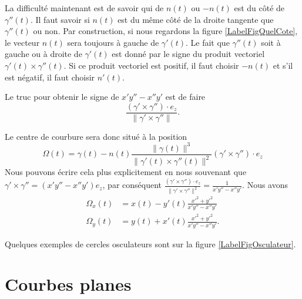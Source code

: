La difficulté maintenant est de savoir qui de $n(t)$ ou $-n(t)$ est du côté de $\gamma''(t)$. Il faut savoir si $n(t)$ est du même côté de la droite tangente que $\gamma''(t)$ ou non. Par construction, si nous regardons la figure  \ref{LabelFigQuelCote}, le vecteur $n(t)$ sera toujours à gauche de $\gamma'(t)$. Le fait que $\gamma''(t)$ soit à gauche ou à droite de $\gamma'(t)$ est donné par le signe du produit vectoriel $\gamma'(t)\times \gamma''(t)$. Si ce produit vectoriel est positif, il faut choisir $-n(t)$ et s'il est négatif, il faut choisir $n'(t)$.

Le truc pour obtenir le signe de $x'y''-x''y'$ est de faire
\begin{equation}
    \frac{ (\gamma'\times\gamma'')\cdot e_z}{\| \gamma'\times\gamma'' \|}.
\end{equation}

Le centre de courbure sera donc situé à la position
\begin{equation}
    \Omega(t)=\gamma(t)-n(t)\frac{ \| \gamma(t) \|^3 }{ \| \gamma'(t)\times\gamma''(t) \|^2 } (\gamma'\times\gamma'')\cdot e_z
\end{equation}
Nous pouvons écrire cela plus explicitement en nous souvenant que $\gamma'\times\gamma''=(x'y''-x''y')e_z$, par conséquent $\frac{ (\gamma'\times\gamma'')\cdot e_z}{\| \gamma'\times\gamma'' \|^2}=\frac{1}{ x'y''-x''y' }$. Nous avons
\begin{subequations}
    \begin{align}
        \Omega_x(t)&=x(t)-y'(t)\frac{ x'^2+y'^2 }{ x'y''-x''y' }\\
        \Omega_y(t)&=y(t)+x'(t)\frac{ x'^2+y'^2 }{ x'y''-x''y' }.
    \end{align}
\end{subequations}

Quelques exemples de cercles osculateurs sont sur la figure \ref{LabelFigOsculateur}.
\newcommand{\CaptionFigOsculateur}{Exemple de cercles osculateurs.}



\section{Courbes planes}

